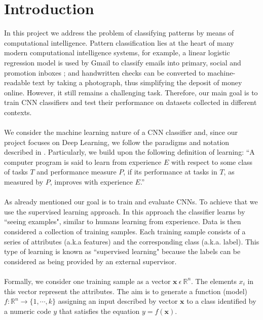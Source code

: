 \documentclass[a4paper, 11pt, twoside, openright]{article}
\begin{document}
\section{Introduction} \label{introref}
In this project we address the problem of classifying patterns by means of computational intelligence. Pattern classification lies at the heart of many modern computational intelligence systems, for example, a linear logistic regression model is used by Gmail to classify emails into primary, social and promotion inboxes \cite{Aberdeen2010TheLB}; and handwritten checks can be converted to machine-readable text by taking a photograph, thus simplifying the deposit of money online. However, it still remains a challenging task. Therefore, our main goal is to train CNN classifiers and test their performance on datasets collected in different contexts.
\\ \\
We consider the machine learning nature of a CNN classifier and, since our project focuses on Deep Learning, we follow the paradigms and notation described in \cite{Goodfellow-et-al-2016}. Particularly, we build upon the following definition of learning:
``A computer program is said to learn from experience $E$ with respect to some class of tasks $T$ and performance measure $P$, if its performance at tasks in $T$, as measured by $P$, improves with experience $E$.” \cite{Mitchell97a}
\\ \\
As already mentioned our goal is to train and evaluate CNNs. To achieve that we use the supervised learning approach. In this approach the classifier learns by ``seeing examples", similar to humans learning from experience. Data is then considered a collection of training samples. Each training sample consists of a series of attributes (a.k.a features) and the corresponding class (a.k.a. label). This type of learning is known as ``supervised learning" because the labels can be considered as being provided by an external supervisor.
\\ \\
Formally, we consider one training sample as a vector $\mathit{\mathbf{x}}\ \epsilon \  \mathbb{R}^n$. The elements $x_i$ in this vector represent the attributes. The aim is to generate a function (model) $f: \mathbb{R}^n \to \{1, \cdots, k\}$ assigning an input described by vector $\mathbf{x}$ to a class identified by a numeric code $y$ that satisfies the equation $y = f(\mathbf{x})$.
\\ \\
\end{document}

